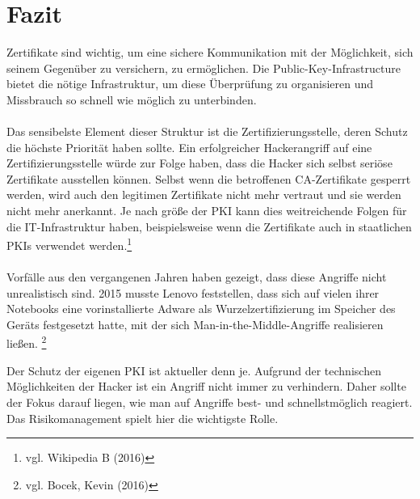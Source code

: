 \section{Fazit}
Zertifikate sind wichtig, um eine sichere Kommunikation mit der Möglichkeit, sich seinem Gegenüber zu versichern, zu ermöglichen. Die Public-Key-Infrastructure bietet die nötige Infrastruktur, um diese Überprüfung zu organisieren und Missbrauch so schnell wie möglich zu unterbinden.\\
\\
Das sensibelste Element dieser Struktur ist die Zertifizierungsstelle, deren Schutz die höchste Priorität haben sollte. Ein erfolgreicher Hackerangriff auf eine Zertifizierungsstelle würde zur Folge haben, dass die Hacker sich selbst seriöse Zertifikate ausstellen können. Selbst wenn die betroffenen CA-Zertifikate gesperrt werden, wird auch den legitimen Zertifikate nicht mehr vertraut und sie werden nicht mehr anerkannt. Je nach größe der PKI kann dies weitreichende Folgen für die IT-Infrastruktur haben, beispielsweise wenn die Zertifikate auch in staatlichen PKIs verwendet werden.\footnote{vgl. Wikipedia B (2016)}\\
\\
Vorfälle aus den vergangenen Jahren haben gezeigt, dass diese Angriffe nicht unrealistisch sind. 2015 musste Lenovo feststellen, dass sich auf vielen ihrer Notebooks eine vorinstallierte Adware als Wurzelzertifizierung im Speicher des Geräts festgesetzt hatte, mit der sich Man-in-the-Middle-Angriffe realisieren ließen.
\footnote{vgl. Bocek, Kevin (2016)}

Der Schutz der eigenen PKI ist aktueller denn je. Aufgrund der technischen Möglichkeiten der Hacker ist ein Angriff nicht immer zu verhindern.
Daher sollte der Fokus darauf liegen, wie man auf Angriffe best- und schnellstmöglich reagiert. Das Risikomanagement spielt hier die wichtigste Rolle.